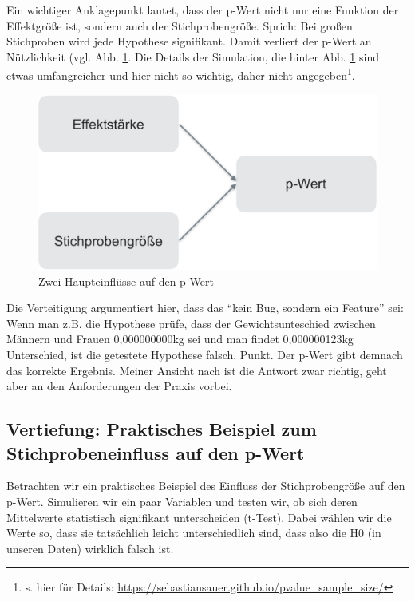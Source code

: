 \documentclass[12pt,ngerman,]{book}
\let\rmarkdownfootnote\footnote%
\def\footnote{\protect\rmarkdownfootnote}
\begin{document}
Ein wichtiger Anklagepunkt lautet, dass der p-Wert nicht nur eine
Funktion der Effektgröße ist, sondern auch der Stichprobengröße. Sprich:
Bei großen Stichproben wird jede Hypothese signifikant. Damit verliert
der p-Wert an Nützlichkeit (vgl. Abb. \ref{fig:einfluss-pwert}. Die
Details der Simulation, die hinter Abb. \ref{fig:einfluss-pwert} sind
etwas umfangreicher und hier nicht so wichtig, daher nicht
angegeben\footnote{s. hier für Details:
  \url{https://sebastiansauer.github.io/pvalue_sample_size/}}.

\begin{figure}

{\centering \includegraphics[width=0.7\linewidth]{images/einfluss_pwert_crop} 

}

\caption{Zwei Haupteinflüsse auf den p-Wert}\label{fig:einfluss-pwert}
\end{figure}

Die Verteitigung argumentiert hier, dass das ``kein Bug, sondern ein
Feature'' sei: Wenn man z.B. die Hypothese prüfe, dass der
Gewichtsunteschied zwischen Männern und Frauen 0,000000000kg sei und man
findet 0,000000123kg Unterschied, ist die getestete Hypothese falsch.
Punkt. Der p-Wert gibt demnach das korrekte Ergebnis. Meiner Ansicht
nach ist die Antwort zwar richtig, geht aber an den Anforderungen der
Praxis vorbei.

\subsection{Vertiefung: Praktisches Beispiel zum Stichprobeneinfluss auf
den
p-Wert}\label{vertiefung-praktisches-beispiel-zum-stichprobeneinfluss-auf-den-p-wert}

Betrachten wir ein praktisches Beispiel des Einfluss der
Stichprobengröße auf den p-Wert. Simulieren wir ein paar Variablen und
testen wir, ob sich deren Mittelwerte statistisch signifikant
unterscheiden (t-Test). Dabei wählen wir die Werte so, dass sie
tatsächlich leicht unterschiedlich sind, dass also die H0 (in unseren
Daten) wirklich falsch ist.
\end{document}
